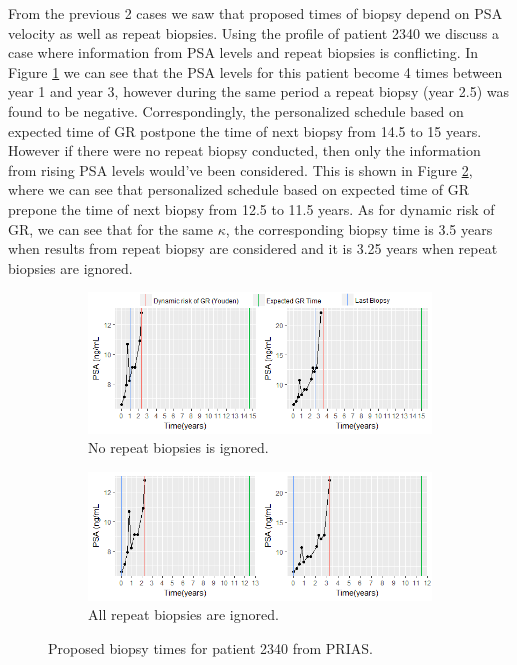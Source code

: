 From the previous 2 cases we saw that proposed times of biopsy depend on PSA velocity as well as repeat biopsies. Using the profile of patient 2340 we discuss a case where information from PSA levels and repeat biopsies is conflicting. In Figure \ref{fig : prias_demo_pid_2340_yes_biopsy} we can see that the PSA levels for this patient become 4 times between year 1 and year 3, however during the same period a repeat biopsy (year 2.5) was found to be negative. Correspondingly, the personalized schedule based on expected time of GR postpone the time of next biopsy from 14.5 to 15 years. However if there were no repeat biopsy conducted, then only the information from rising PSA levels would've been considered. This is shown in Figure \ref{fig : prias_demo_pid_2340_no_biopsy}, where we can see that personalized schedule based on expected time of GR prepone the time of next biopsy from 12.5 to 11.5 years. As for dynamic risk of GR, we can see that for the same $\kappa$, the corresponding biopsy time is 3.5 years when results from repeat biopsy are considered and it is 3.25 years when repeat biopsies are ignored.

\begin{figure}[!htb]
    \centering
    \captionsetup{justification=centering}
     \begin{subfigure}[b]{\textwidth}
        \includegraphics[width=\textwidth]{images/prias_demo/case_2340_yesbiopsy.png}
        \caption{No repeat biopsies is ignored.}
        \label{fig : prias_demo_pid_2340_yes_biopsy}
    \end{subfigure}
    \begin{subfigure}[b]{\textwidth}
        \includegraphics[width=\textwidth]{images/prias_demo/case_2340_nobiopsy.png}
        \caption{All repeat biopsies are ignored.}
        \label{fig : prias_demo_pid_2340_no_biopsy}
    \end{subfigure}
    \label{fig : prias_demo_pid_2340}
    \caption{Proposed biopsy times for patient 2340 from PRIAS.}
\end{figure}